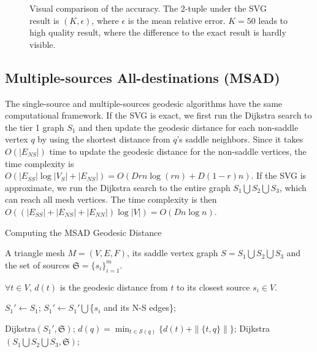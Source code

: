 \begin{figure}[htbp]
\begin{small}
\end{small}
\vspace{-0.01in} \caption{Visual comparison of the accuracy. The
2-tuple under the SVG result is $(K,\epsilon)$, where $\epsilon$ is
the mean relative error. $K=50$ leads to high quality result, where
the difference to the exact result is hardly visible.}
\label{fig:bimba}\end{figure}

\subsection{Multiple-sources All-destinations (MSAD)}
\label{subsec:ssad}

The single-source and multiple-sources geodesic algorithms have the
same computational framework. If the SVG is exact, we first run the
Dijkstra search to the tier 1 graph $S_1$ and then update the
geodesic distance for each non-saddle vertex $q$ by using the
shortest distance from $q$'s saddle neighbors. Since it takes
$O(|E_{NS}|)$ time to update the geodesic distance for the
non-saddle vertices, the time complexity is
$O(|E_{SS}|\log|V_S|+|E_{NS}|)=O(Drn\log(rn)+D(1-r)n)$. If the SVG
is approximate, we run the Dijkstra search to the entire graph
$S_1\bigcup S_2\bigcup S_3$, which can reach all mesh vertices. The
time complexity is then $O((|E_{SS}|+|E_{NS}|+|E_{NN}|)\log |V|) =
O(Dn\log n)$.

\begin{algorithm}[htbp]
\caption{Computing the MSAD Geodesic Distance}
\begin{algorithmic}[1]

\Require A triangle mesh $M=(V,E,F)$, its saddle vertex graph
$S=S_1\bigcup S_2\bigcup S_3$ and the set of sources
$\mathfrak{S}=\{s_i\}_{i=1}^m$.

\Ensure $\forall t\in V$, $d(t)$ is the geodesic distance from $t$
to its closest source $s_i\in V$.

 \State $S_1'\gets S_1$;   \State $S_1' \gets S_1'
\bigcup$\{$s_i$ and its N-S edges\}; \EndIf \EndFor

\State Dijkstra$(S_1', \mathfrak{S})$; 
    \State $d(q)=\min_{t\in \mathcal{S}(q)} \{d(t)+\|\{t,q\}\|\}$;
\EndFor \Else \State Dijkstra$(S_1\bigcup S_2\bigcup S_3,
\mathfrak{S})$; \EndIf
\end{algorithmic}
\end{algorithm}


